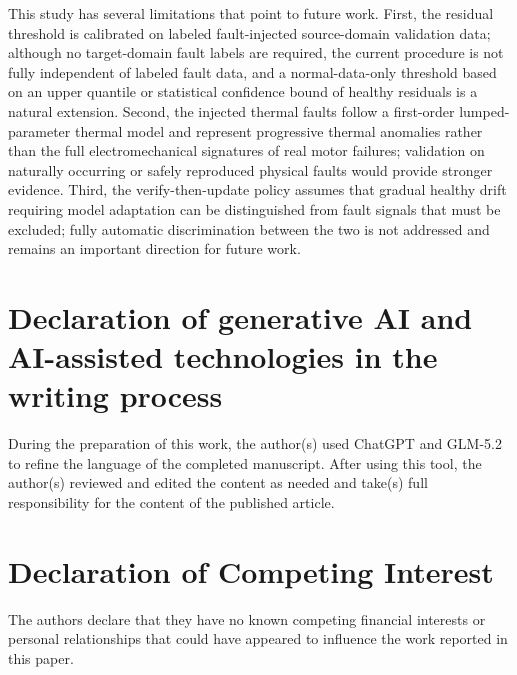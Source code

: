 \documentclass[a4paper,10pt]{cas-sc}%
\newcommand{\rev}[1]{\textcolor{revisionred}{#1}}
\newenvironment{revision}{\color{revisionred}}{}
\begin{document}
\begin{revision}
	This study has several limitations that point to future work. First, the residual threshold is calibrated on labeled fault-injected source-domain validation data; although no target-domain fault labels are required, the current procedure is not fully independent of labeled fault data, and a normal-data-only threshold based on an upper quantile or statistical confidence bound of healthy residuals is a natural extension. Second, the injected thermal faults follow a first-order lumped-parameter thermal model and represent progressive thermal anomalies rather than the full electromechanical signatures of real motor failures; validation on naturally occurring or safely reproduced physical faults would provide stronger evidence. Third, the verify-then-update policy assumes that gradual healthy drift requiring model adaptation can be distinguished from fault signals that must be excluded; fully automatic discrimination between the two is not addressed and remains an important direction for future work.
\end{revision}

%
%
\section*{Declaration of generative AI and AI-assisted technologies in the writing process}
\rev{During the preparation of this work, the author(s) used ChatGPT and GLM-5.2 to refine the language of the completed manuscript. After using this tool, the author(s) reviewed and edited the content as needed and take(s) full responsibility for the content of the published article.}


\section*{Declaration of Competing Interest}
The authors declare that they have no known competing financial interests or personal relationships that could have appeared to influence the work reported in this paper.


% 
% 




\end{document}
